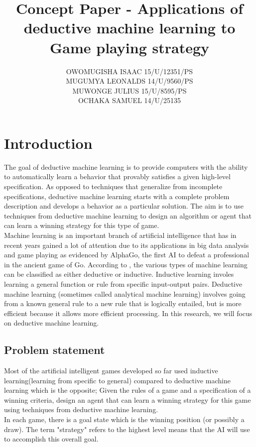 \documentclass[11pt]{article}
\title{Concept Paper - Applications of deductive machine learning to Game playing strategy}
\author{OWOMUGISHA ISAAC \hspace{1cm}15/U/12351/PS\\ MUGUMYA LEONALDS \hspace{1cm} 14/U/9560/PS\\MUWONGE JULIUS \hspace{1cm} 15/U/8595/PS \\ OCHAKA SAMUEL \hspace{1cm} 14/U/25135}
\date{}
\begin{document}
\maketitle

\section{Introduction}
The goal of deductive machine learning is to provide computers with the ability to automatically learn a behavior that provably satisfies a given high-level specification. As opposed to techniques that generalize from incomplete specifications, deductive machine learning starts with a complete problem description and develops a behavior as a particular solution. The aim is to use techniques from deductive machine learning to design an algorithm or agent that can learn a winning strategy for this type of game.\\

Machine learning is an important branch of artificial intelligence that has in recent years gained a lot of attention due to its applications in big data analysis and game playing as evidenced by AlphaGo, the first AI to defeat a professional in the ancient game of Go.
According to \cite{russell2010artificial}, the various types of machine learning can be classified as either deductive or inductive. Inductive learning involes learning a general function or rule from specific input-output pairs. Deductive machine learning (sometimes called analytical machine learning) involves going from a known general rule to a new rule that is logically entailed, but is more efficient because it allows more efficient processing. In this research, we will focus on deductive machine learning.\\

\subsection{Problem statement}
Most of the artificial intelligent games developed so far used inductive learning(learning from specific to general) compared to deductive machine learning which is the opposite; Given the rules of a game and a specification of a winning criteria, design an agent that can learn a winning strategy for this game using techniques from deductive machine learning.\\

In each game, there is a goal state which is the winning position (or possibly a draw). The term "strategy" refers to the highest level means that the AI will use to accomplish this overall goal.
\end{document}
